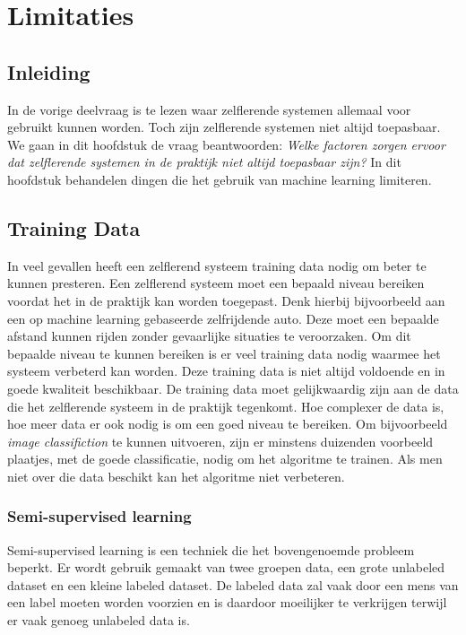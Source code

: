 \section{Limitaties}

\subsection{Inleiding}
In de vorige deelvraag is te lezen waar zelflerende systemen allemaal voor gebruikt kunnen worden. Toch zijn zelflerende systemen niet altijd toepasbaar. We gaan in dit hoofdstuk de vraag beantwoorden: \textit{Welke factoren zorgen ervoor dat zelflerende systemen in de praktijk niet altijd toepasbaar zijn?} In dit hoofdstuk behandelen dingen die het gebruik van machine learning limiteren. 

\subsection{Training Data}
In  veel gevallen heeft een zelflerend systeem training data nodig om beter te kunnen presteren. Een zelflerend systeem moet een bepaald niveau bereiken voordat het in de praktijk kan worden toegepast. Denk hierbij bijvoorbeeld aan een op machine learning gebaseerde zelfrijdende auto. Deze moet een bepaalde afstand kunnen rijden zonder gevaarlijke situaties te veroorzaken. Om dit bepaalde niveau te kunnen bereiken is er veel training data nodig waarmee het systeem verbeterd kan worden. Deze training data is niet altijd voldoende en in goede kwaliteit beschikbaar. De training data moet gelijkwaardig zijn aan de data die het zelflerende systeem in de praktijk tegenkomt. Hoe complexer de data is, hoe meer data er ook nodig is om een goed niveau te bereiken. Om bijvoorbeeld \textit{image classifiction} te kunnen uitvoeren, zijn er minstens duizenden voorbeeld plaatjes, met de goede classificatie, nodig om het algoritme te trainen. Als men niet over die data beschikt kan het algoritme niet verbeteren. 

\subsubsection{Semi-supervised learning}
Semi-supervised learning is een techniek die het bovengenoemde probleem beperkt. Er wordt gebruik gemaakt van twee groepen data, een grote unlabeled dataset en een kleine labeled dataset. De labeled data zal vaak door een mens van een label moeten worden voorzien en is daardoor moeilijker te verkrijgen terwijl er vaak genoeg unlabeled data is. \cite{SemiSupervisedLearning}

